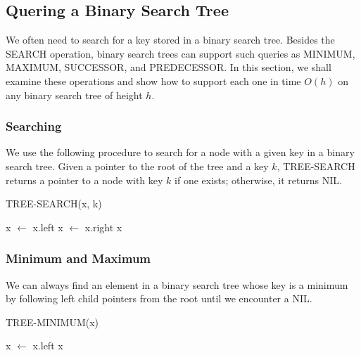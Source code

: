\subsection{Quering a Binary Search Tree}

We often need to search for a key stored in a binary search tree. Besides the SEARCH operation, binary search trees can support such queries as MINIMUM, MAXIMUM, SUCCESSOR, and PREDECESSOR. In this section, we shall examine these operations and show how to support each one in time $O(h)$ on any binary search tree of height $h$.

\vspace{-0.5em}

\subsubsection*{Searching}

\begin{definitionblock}[Searching]
    We use the following procedure to search for a node with a given key in a binary search tree. Given a pointer to the root of the tree and a key $k$, TREE-SEARCH returns a pointer to a node with key $k$ if one exists; otherwise, it returns NIL.
\end{definitionblock}

\begin{algorithm}[H]
    \caption{TREE-SEARCH(x, k)}
    \begin{algorithmic}[1]
                \State x $\gets$ x.left
            \Else
                \State x $\gets$ x.right
            \EndIf
        \EndWhile
        \State \Return x
    \end{algorithmic}
\end{algorithm}

\subsubsection*{Minimum and Maximum}

We can always find an element in a binary search tree whose key is a minimum by
following left child pointers from the root until we encounter a NIL.

\begin{algorithm}[H]
    \caption{TREE-MINIMUM(x)}
    \begin{algorithmic}[1]
            \State x $\gets$ x.left
        \EndWhile
        \State \Return x
    \end{algorithmic}
\end{algorithm}

